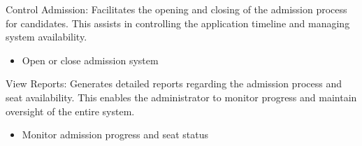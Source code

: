 \vspace{0.2cm}
\noindent Control Admission:
Facilitates the opening and closing of the admission process for candidates. This assists in controlling the application timeline and managing system availability.
\begin{itemize}
    \item Open or close admission system
\end{itemize}

\vspace{0.2cm}
\noindent View Reports:
Generates detailed reports regarding the admission process and seat availability. This enables the administrator to monitor progress and maintain oversight of the entire system.
\begin{itemize}
    \item Monitor admission progress and seat status
\end{itemize}
